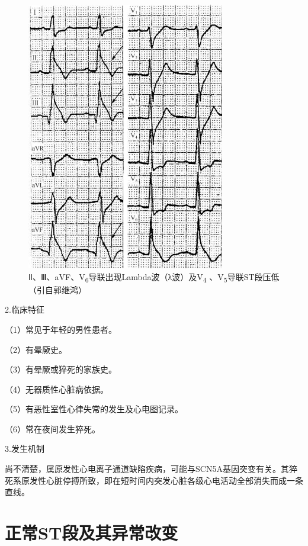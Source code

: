 \begin{figure}[!htbp]
 \centering
 \includegraphics[width=3.40625in,height=4.63542in]{./images/Image00081.jpg}
 \captionsetup{justification=centering}
 \caption{Ⅱ、Ⅲ、aVF、V\textsubscript{6}导联出现Lambda波（λ波）及V\textsubscript{4} 、V\textsubscript{5}导联ST段压低（引自郭继鸿）}
 \label{fig4-6}
  \end{figure} 


2.临床特征

（1）常见于年轻的男性患者。

（2）有晕厥史。

（3）有晕厥或猝死的家族史。

（4）无器质性心脏病依据。

（5）有恶性室性心律失常的发生及心电图记录。

（6）常在夜间发生猝死。

3.发生机制

尚不清楚，属原发性心电离子通道缺陷疾病，可能与SCN5A基因突变有关。其猝死系原发性心脏停搏所致，即在短时间内突发心脏各级心电活动全部消失而成一条直线。

\protect\hypertarget{text00011.html}{}{}

\protect\hypertarget{text00011.htmlux5cux23chapter11}{}{}

\chapter{正常ST段及其异常改变}

